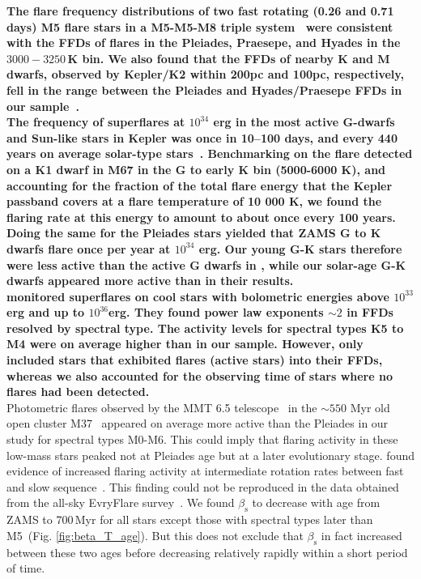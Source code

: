 \documentclass{aa}
\begin{document}
\textbf{The flare frequency distributions of two fast rotating (0.26 and 0.71 days) M5 flare stars in a M5-M5-M8 triple system~\citep{lurie2015} were consistent with the FFDs of flares in the Pleiades, Praesepe, and Hyades in the $3000-3250\,$K bin. We also found that the FFDs of nearby K and M dwarfs, observed by Kepler/K2 within 200pc and 100pc, respectively, fell in the range between the Pleiades and Hyades/Praesepe FFDs in our sample~\citep{lin2019}.
\\
The frequency of superflares at $10^{34}$ erg in the most active G-dwarfs and Sun-like stars in Kepler was once in 10–100 days, and every 440 years on average solar-type stars~\citep{shibayama2013}. Benchmarking on the flare detected on a K1 dwarf in M67 in the G to early K bin (5000-6000 K), and accounting for the fraction of the total flare energy that the Kepler passband covers at a flare temperature of 10 000 K, we found the flaring rate at this energy to amount to about once every 100 years. Doing the same for the Pleiades stars yielded that ZAMS G to K dwarfs flare once per year at $10^{34}$ erg. Our young G-K stars therefore were less active than the active G dwarfs in \citet{shibayama2013}, while our solar-age G-K dwarfs appeared more active than in their results.
\\
\citet{howard2019} monitored superflares on cool stars with bolometric energies above $10^{33}$ erg and up to $10^{36}$erg. They found power law exponents $\sim 2$ in FFDs resolved by spectral type. The activity levels for spectral types K5 to M4 were on average higher than in our sample. However, \citet{howard2019} only included stars that exhibited flares (active stars) into their FFDs, whereas we also accounted for the observing time of stars where no flares had been detected.} 
\\
Photometric flares observed by the MMT 6.5 telescope~\citep{hartman2008} in the $\sim550$ Myr old open cluster M37~\citep{chang2015} appeared on average more active than the Pleiades in our study for spectral types M0-M6. This could imply that flaring activity in these low-mass stars peaked not at Pleiades age but at a later evolutionary stage. \citet{mondrik2019} found evidence of increased flaring activity at intermediate rotation rates between fast and slow sequence~\citep{barnes_rotational_2003}. This finding could not be reproduced in the data obtained from the all-sky EvryFlare survey~\citep{howard2020}. We found $\beta_\mathrm{s}$ to decrease with age from ZAMS to 700\,Myr for all stars except those with spectral types later than M5~(Fig. \ref{fig:beta_T_age}). But this does not exclude that $\beta_\mathrm{s}$ in fact increased between these two ages before decreasing relatively rapidly within a short period of time.
\end{document}
